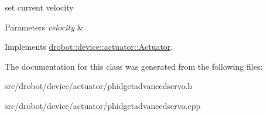 set current velocity 


\begin{DoxyParams}{Parameters}
{\em velocity} & \\
\hline
\end{DoxyParams}


Implements \hyperlink{classdrobot_1_1device_1_1actuator_1_1Actuator_a452a63a9cf5daf479c12b99c3e99679c}{drobot\-::device\-::actuator\-::\-Actuator}.



The documentation for this class was generated from the following files\-:\begin{DoxyCompactItemize}
\item 
src/drobot/device/actuator/phidgetadvancedservo.\-h\item 
src/drobot/device/actuator/phidgetadvancedservo.\-cpp\end{DoxyCompactItemize}
